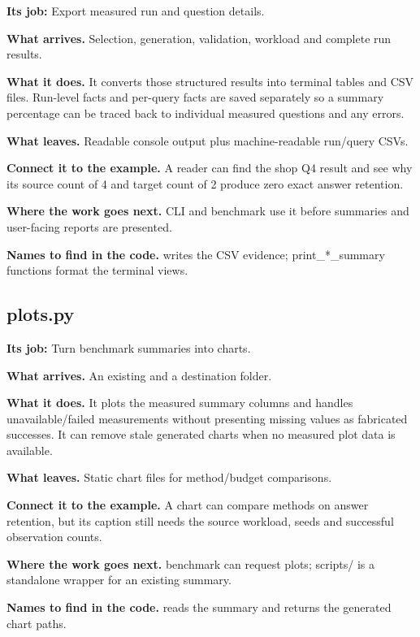 \textbf{Its job:} Export measured run and question details.

\textbf{What arrives.} Selection, generation, validation, workload and complete run results.

\textbf{What it does.} It converts those structured results into terminal tables and CSV files. Run-level facts and per-query facts are saved separately so a summary percentage can be traced back to individual measured questions and any errors.

\textbf{What leaves.} Readable console output plus machine-readable run/query CSVs.

\textbf{Connect it to the example.} A reader can find the shop Q4 result and see why its source count of 4 and target count of 2 produce zero exact answer retention.

\textbf{Where the work goes next.} CLI and benchmark use it before summaries and user-facing reports are presented.

\textbf{Names to find in the code.}  writes the CSV evidence; print\_*\_summary functions format the terminal views.


\subsection{plots.py}

\textbf{Its job:} Turn benchmark summaries into charts.

\textbf{What arrives.} An existing  and a destination folder.

\textbf{What it does.} It plots the measured summary columns and handles unavailable/failed measurements without presenting missing values as fabricated successes. It can remove stale generated charts when no measured plot data is available.

\textbf{What leaves.} Static chart files for method/budget comparisons.

\textbf{Connect it to the example.} A chart can compare methods on answer retention, but its caption still needs the source workload, seeds and successful observation counts.

\textbf{Where the work goes next.} benchmark can request plots; scripts/ is a standalone wrapper for an existing summary.

\textbf{Names to find in the code.}  reads the summary and returns the generated chart paths.

